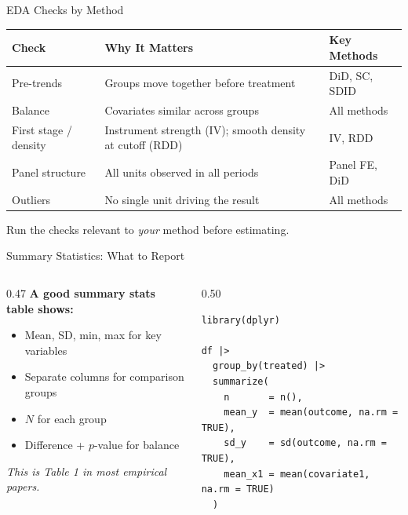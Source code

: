 \begin{frame}{EDA Checks by Method}
  \footnotesize
  \begin{tabular}{@{}l>{\raggedright\arraybackslash}p{4.5cm}>{\raggedright\arraybackslash}p{4cm}@{}}
    \toprule
    \textbf{Check} & \textbf{Why It Matters} & \textbf{Key Methods} \\
    \midrule
    Pre-trends &
      Groups move together before treatment &
      DiD, SC, SDID \\[2pt]
    Balance &
      Covariates similar across groups &
      All methods \\[2pt]
    First stage / density &
      Instrument strength (IV); smooth density at cutoff (RDD) &
      IV, RDD \\[2pt]
    Panel structure &
      All units observed in all periods &
      Panel FE, DiD \\[2pt]
    Outliers &
      No single unit driving the result &
      All methods \\
    \bottomrule
  \end{tabular}

  \vspace{2pt}

  \normalsize
  Run the checks relevant to \textit{your} method before estimating.
\end{frame}

\begin{frame}[fragile]{Summary Statistics: What to Report}
  \begin{columns}[T]
    \begin{column}{0.47\textwidth}
      \textbf{A good summary stats table shows:}
      \begin{itemize}
        \item Mean, SD, min, max for key variables
        \item Separate columns for comparison groups
        \item $N$ for each group
        \item Difference + $p$-value for balance
      \end{itemize}

      \vspace{4pt}

      \textit{This is Table 1 in most empirical papers.}
    \end{column}
    \begin{column}{0.50\textwidth}
\begin{lstlisting}[style=terminal, basicstyle=\ttfamily\footnotesize\color{darkgray}]
library(dplyr)

df |>
  group_by(treated) |>
  summarize(
    n       = n(),
    mean_y  = mean(outcome, na.rm = TRUE),
    sd_y    = sd(outcome, na.rm = TRUE),
    mean_x1 = mean(covariate1, na.rm = TRUE)
  )
\end{lstlisting}
    \end{column}
  \end{columns}
\end{frame}

